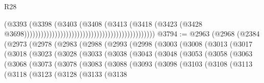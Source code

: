 \begin{lexlean}{R28}
\begin{coremodule}
                                                                                  (@3393
                                                                                    (@3398
                                                                                      (@3403
                                                                                        (@3408
                                                                                          (@3413
                                                                                            (@3418
                                                                                              (@3423
                                                                                                (@3428
                                                                                                  @3698)))))))))))))))))))))))))))))))))))))))))))))))
@3794 := @2963
    (@2968
      (@2384
        (@2973
          (@2978
            (@2983
              (@2988
                (@2993
                  (@2998
                    (@3003
                      (@3008
                        (@3013
                          (@3017
                            (@3018
                              (@3023
                                (@3028
                                  (@3033
                                    (@3038
                                      (@3043
                                        (@3048
                                          (@3053
                                            (@3058
                                              (@3063
                                                (@3068
                                                  (@3073
                                                    (@3078
                                                      (@3083
                                                        (@3088
                                                          (@3093
                                                            (@3098
                                                              (@3103
                                                                (@3108
                                                                  (@3113
                                                                    (@3118
                                                                      (@3123
                                                                        (@3128
                                                                          (@3133
                                                                            (@3138

\end{coremodule}
\end{lexlean}
